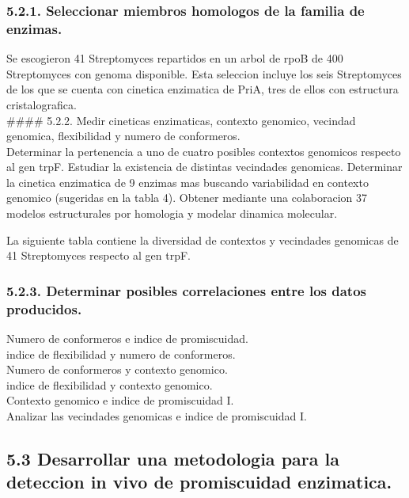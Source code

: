 \documentclass[12pt,twoside]{reedthesis}
\begin{document}
  \subsubsection{5.2.1. Seleccionar miembros homologos de la familia de
  enzimas.}\label{seleccionar-miembros-homologos-de-la-familia-de-enzimas.}
  
  Se escogieron 41 Streptomyces repartidos en un arbol de rpoB de 400
  Streptomyces con genoma disponible. Esta seleccion incluye los seis
  Streptomyces de los que se cuenta con cinetica enzimatica de PriA, tres
  de ellos con estructura cristalografica.\\
  \#\#\#\# 5.2.2. Medir cineticas enzimaticas, contexto genomico, vecindad
  genomica, flexibilidad y numero de conformeros.\\
  Determinar la pertenencia a uno de cuatro posibles contextos genomicos
  respecto al gen trpF. Estudiar la existencia de distintas vecindades
  genomicas. Determinar la cinetica enzimatica de 9 enzimas mas buscando
  variabilidad en contexto genomico (sugeridas en la tabla 4). Obtener
  mediante una colaboracion 37 modelos estructurales por homologia y
  modelar dinamica molecular.
  
  La siguiente tabla contiene la diversidad de contextos y vecindades
  genomicas de 41 Streptomyces respecto al gen trpF.
  
  \subsubsection{5.2.3. Determinar posibles correlaciones entre los datos
  producidos.}\label{determinar-posibles-correlaciones-entre-los-datos-producidos.}
  
  Numero de conformeros e indice de promiscuidad.\\
  indice de flexibilidad y numero de conformeros.\\
  Numero de conformeros y contexto genomico.\\
  indice de flexibilidad y contexto genomico.\\
  Contexto genomico e indice de promiscuidad I.\\
  Analizar las vecindades genomicas e indice de promiscuidad I.
  
  \subsection{5.3 Desarrollar una metodologia para la deteccion in vivo de
  promiscuidad
  enzimatica.}\label{desarrollar-una-metodologia-para-la-deteccion-in-vivo-de-promiscuidad-enzimatica.}
  
\end{document}
